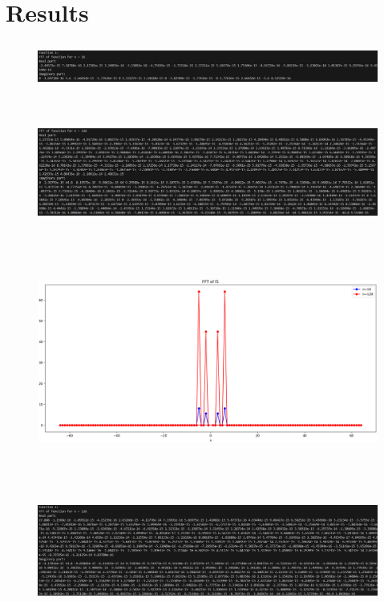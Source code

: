 \documentclass{ctexart}
\begin{document}
	\section{Results}
	\begin{figure}[H]
		\centering 
		\includegraphics[height=1.5cm,width=14cm]{7.png}
		\caption{}
	\end{figure}
	\begin{figure}[H]
		\centering 
		\includegraphics[height=4.5cm,width=14cm]{8.png}
		\caption{}
	\end{figure}
	\begin{figure}[H]
		\centering 
		\includegraphics[height=7cm,width=14cm]{1.png}
		\caption{}
	\end{figure}
	\begin{figure}[H]
		\centering 
		\includegraphics[height=4.5cm,width=14cm]{9.png}
		\caption{}
	\end{figure}
\end{document}
